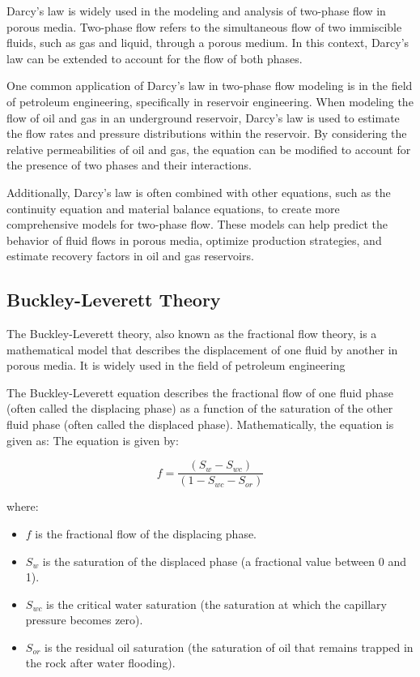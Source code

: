 \documentclass[letterpaper,12pt]{article}
\begin{document}
		
		
		Darcy's law is widely used in the modeling and analysis of two-phase flow in porous media. Two-phase flow refers to the simultaneous flow of two immiscible fluids, such as gas and liquid, through a porous medium. In this context, Darcy's law can be extended to account for the flow of both phases.
		\smallskip
		
		One common application of Darcy's law in two-phase flow modeling is in the field of petroleum engineering, specifically in reservoir engineering. When modeling the flow of oil and gas in an underground reservoir, Darcy's law is used to estimate the flow rates and pressure distributions within the reservoir. By considering the relative permeabilities of oil and gas, the equation can be modified to account for the presence of two phases and their interactions.
		\smallskip
		
		Additionally, Darcy's law is often combined with other equations, such as the continuity equation and material balance equations, to create more comprehensive models for two-phase flow. These models can help predict the behavior of fluid flows in porous media, optimize production strategies, and estimate recovery factors in oil and gas reservoirs.
		
	

	
	\subsection{Buckley-Leverett Theory}
		The Buckley-Leverett theory, also known as the fractional flow theory, is a mathematical model that describes the displacement of one fluid by another in porous media. It is widely used in the field of petroleum engineering 
		
		\smallskip
		
		The Buckley-Leverett equation describes the fractional flow of one fluid phase (often called the displacing phase) as a function of the saturation of the other fluid phase (often called the displaced phase). Mathematically, the equation is given as:
			The equation is given by:
		
			
			\[ f = \frac{{(S_w - S_{wc})}}{{(1 - S_{wc} - S_{or})}} \]
			
			where:
		\begin{itemize}
			\item \( f \) is the fractional flow of the displacing phase.
			\item \( S_w \) is the saturation of the displaced phase (a fractional value between 0 and 1).
			\item \( S_{wc} \) is the critical water saturation (the saturation at which the capillary pressure becomes zero).
			\item \( S_{or} \) is the residual oil saturation (the saturation of oil that remains trapped in the rock after water flooding).
		\end{itemize}
		
\end{document}
